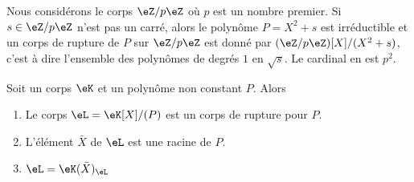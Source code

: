 \begin{example}
    Nous considérons le corps \( \eZ/p\eZ\) où \( p\) est un nombre premier. Si \( s\in \eZ/p\eZ\) n'est pas un carré, alors le polynôme \(P= X^2+s\) est irréductible et un corps de rupture de \( P\) sur \( \eZ/p\eZ\) est donné par \( (\eZ/p\eZ)[X]/(X^2+s)\), c'est à dire l'ensemble des polynômes de degrés \( 1\) en \( \sqrt{s}\). Le cardinal en est \( p^2\).
\end{example}


\begin{proposition}        \label{PROPooUBIIooGZQyeE}
    Soit un corps \( \eK\) et un polynôme non constant \( P\). Alors
    \begin{enumerate}
        \item
            Le corps \( \eL=\eK[X]/(P)\) est un corps de rupture pour \( P\).
        \item
            L'élément \( \bar X\) de \( \eL\) est une racine de \( P\).
        \item
            \( \eL=\eK(\bar X)_{\eL}\)
    \end{enumerate}
\end{proposition}

